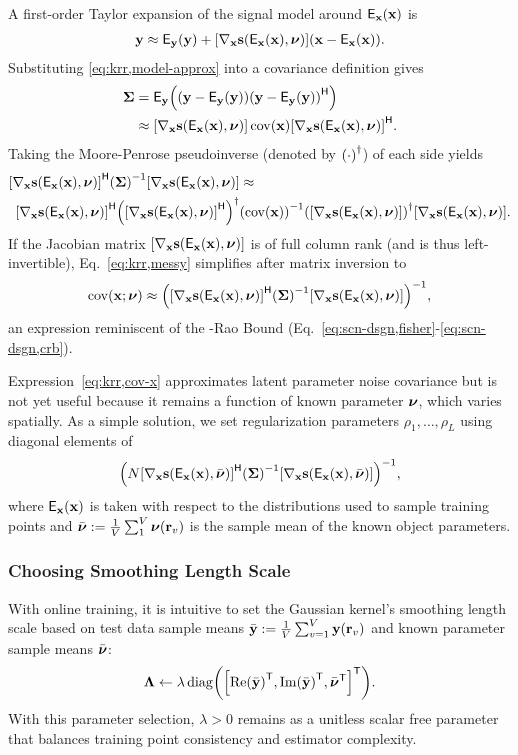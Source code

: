 A first-order Taylor expansion
of the signal model 
around $\expect{\bmx}{\bmx}$ is
\begin{align}
	\bmy \approx \expect{\bmy}{\bmy} + 
		\gradxs \paren{\bmx - \expect{\bmx}{\bmx}}.
	\label{eq:krr,model-approx}
\end{align}
Substituting \eqref{eq:krr,model-approx}
into a covariance definition gives
\begin{align}
	\bmSig &= 
		\expect{\bmy}{
			\paren{\bmy - \expect{\bmy}{\bmy}}
			\paren{\bmy - \expect{\bmy}{\bmy}}\ctpose
		}
		\nonumber \\
		&\approx \gradxs \cov{\bmx} \gradxs\ctpose.
		\label{eq:krr,cov-y}
\end{align}
Taking the Moore-Penrose pseudoinverse 
(denoted by $\pinv{\cdot}$)
of each side yields 
\begin{align}
	\gradxs\ctpose \inv{\bmSig} \gradxs &\approx 
		\label{eq:krr,messy} \\
	\gradxs\ctpose \pinv{\gradxs\ctpose} &\inv{\cov{\bmx}} \pinv{\gradxs} \gradxs.
		\nonumber
\end{align}
If the Jacobian matrix $\gradxs$ 
is of full column rank
(and is thus left-invertible), 
Eq.~\eqref{eq:krr,messy} simplifies
after matrix inversion to
\begin{align}
	\cov{\bmx; \bmnu} \approx \inv{\gradxs\ctpose \inv{\bmSig} \gradxs},
	\label{eq:krr,cov-x}
\end{align}
an expression reminiscent
of the \Cramer-Rao Bound 
(\cf Eq.~\eqref{eq:scn-dsgn,fisher}-\eqref{eq:scn-dsgn,crb}).

Expression~\eqref{eq:krr,cov-x} approximates
latent parameter noise covariance 
but is not yet useful
because it remains a function 
of known parameter $\boldsymbol{\nu}$,
which varies spatially.
As a simple solution,
we set regularization parameters $\rho_1,\dots,\rho_L$
using diagonal elements of
$$\inv{N \gradxvs\ctpose \inv{\bmSig} \gradxvs},$$
where $\expx$ is taken
with respect to 
the distributions 
used to sample training points 
and $\nubar := \frac{1}{V} \sum_1^V \bmnu\paren{\bmr_v}$
is the sample mean 
of the known object parameters.

\subsubsection{Choosing Smoothing Length Scale}
\label{sss,krr,pract,mod,lam}

With online training,
it is intuitive
to set the Gaussian kernel's 
smoothing length scale 
based on test data sample means
$\bar{\bmy} := \frac{1}{V} \sum_{v=1}^V \bmy\paren{\bmr_v}$
and known parameter sample means $\bar{\boldsymbol{\nu}}$:
\begin{align}
	\bmL \gets \lambda 
	\diag{\brac{\re{\bar{\bmy}}\tpose, \im{\bar{\bmy}}\tpose, \nubar\tpose}\tpose}.
	\label{eq:krr,length}
\end{align}
With this parameter selection,
$\lambda>0$ remains 
as a unitless scalar free parameter
that balances training point consistency 
and estimator complexity.

